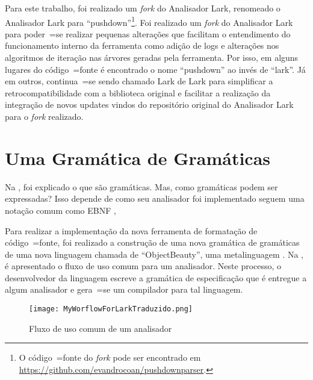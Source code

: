 Para este trabalho,
foi realizado um \textit{fork} \cite{overviewOfGitHubForks,mayTheForkBeWithYou,collaborationAmongGitHubUsers} do Analisador Lark,
renomeado o Analisador Lark \cite{larkContextualLexer} para ``pushdown''\footnote{%
O código~=fonte do \textit{fork} pode ser encontrado em \url{https://github.com/evandrocoan/pushdownparser}.
}.
Foi realizado um \textit{fork} do Analisador Lark para poder~=se realizar pequenas alterações que facilitam o entendimento do funcionamento interno da ferramenta como adição de logs e
alterações nos algoritmos de iteração nas árvores geradas pela ferramenta.
Por isso,
em alguns lugares do código~=fonte é encontrado o nome ``pushdown'' ao invés de ``lark''.
Já em outros,
continua~=se sendo chamado Lark de Lark para simplificar a retrocompatibilidade com a biblioteca original e
facilitar a realização da integração de novos updates vindos do repositório original do Analisador Lark para o \textit{fork} realizado.


\section{Uma Gramática de Gramáticas}
\label{GrammarsGrammar}

Na ,
foi explicado o que são gramáticas.
Mas,
como gramáticas podem ser expressadas?
Isso depende de como seu analisador foi implementado  seguem uma notação comum como EBNF \cite{teachingEbnf,antlrBookTerrentParr,larkGrammarReference,larkStyleCheat},

Para realizar a implementação da nova ferramenta de formatação de código~=fonte,
foi realizado a construção de uma nova gramática de gramáticas de uma nova linguagem chamada de ``ObjectBeauty'',
uma metalinguagem \cite{compilersCompilerMetaLanguage}.
Na ,
é apresentado o fluxo de uso comum para um analisador.
Neste processo,
o desenvolvedor da linguagem escreve a gramática de especificação que é entregue a algum analisador e
gera~=se um compilador para tal linguagem.
\begin{figure}[!htb]
\caption{Fluxo de uso comum de um analisador}
\label{MyWorflowForLarkTraduzido}
\centering
\texttt{[image: MyWorflowForLarkTraduzido.png]}
\end{figure}

